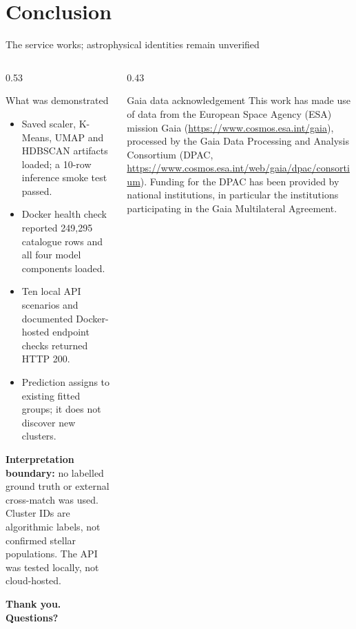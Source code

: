 \documentclass[aspectratio=169,10pt]{beamer}
\begin{document}
\section{Conclusion}

\begin{frame}{The service works; astrophysical identities remain unverified}
\begin{columns}[T]
 \begin{column}{0.53\textwidth}
  \begin{block}{What was demonstrated}
   \footnotesize
   \begin{itemize}\setlength{\itemsep}{2pt}
    \item Saved scaler, K-Means, UMAP and HDBSCAN artifacts loaded; a 10-row inference smoke test passed.
    \item Docker health check reported 249,295 catalogue rows and all four model components loaded.
    \item Ten local API scenarios and documented Docker-hosted endpoint checks returned HTTP 200.
    \item Prediction assigns to existing fitted groups; it does not discover new clusters.
   \end{itemize}
  \end{block}
  \vspace{1mm}
  {\scriptsize\textbf{Interpretation boundary:} no labelled ground truth or external cross-match was used. Cluster IDs are algorithmic labels, not confirmed stellar populations. The API was tested locally, not cloud-hosted.}
  \par\vspace{4mm}
  {\Large\bfseries\color{StrathNavy}Thank you. Questions?}
 \end{column}
 \begin{column}{0.43\textwidth}
  \begin{block}{Gaia data acknowledgement}
   \fontsize{6.2}{7.5}\selectfont
   This work has made use of data from the European Space Agency (ESA) mission Gaia (\url{https://www.cosmos.esa.int/gaia}), processed by the Gaia Data Processing and Analysis Consortium (DPAC, \url{https://www.cosmos.esa.int/web/gaia/dpac/consortium}). Funding for the DPAC has been provided by national institutions, in particular the institutions participating in the Gaia Multilateral Agreement.
   \vspace{2mm}


\end{block}
\end{column}
\end{columns}
\end{frame}
\end{document}
